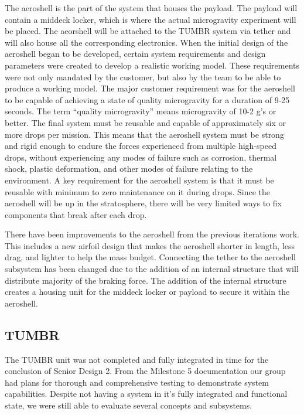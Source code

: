 \indent\indent The aeroshell is the part of the system that houses the payload. The payload will contain a middeck locker, which is where the actual microgravity experiment will be placed. The aeorshell will be attached to the TUMBR system via tether and will also house all the corresponding electronics. When the initial design of the aeroshell began to be developed, certain system requirements and design parameters were created to develop a realistic working model. These requirements were not only mandated by the customer, but also by the team to be able to produce a working model. The major customer requirement was for the aeroshell to be capable of achieving a state of quality microgravity for a duration of 9-25 seconds. The term “quality microgravity” means microgravity of 10-2 g’s or better. The final system must be reusable and capable of approximately six or more drops per mission. This means that the aeroshell system must be strong and rigid enough to endure the forces experienced from multiple high-speed drops, without experiencing any modes of failure such as corrosion, thermal shock, plastic deformation, and other modes of failure relating to the environment. A key requirement for the aeroshell system is that it must be reusable with minimum to zero maintenance on it during drops. Since the aeroshell will be up in the stratosphere, there will be very limited ways to fix components that break after each drop.

There have been improvements to the aeroshell from the previous iterations work. This includes a new airfoil design that makes the aeroshell shorter in length, less drag, and lighter to help the mass budget. Connecting the tether to the aeroshell subsystem has been changed due to the addition of an internal structure that will distribute majority of the braking force. The addition of the internal structure creates a housing unit for the middeck locker or payload to secure it within the aeroshell.

\subsection{TUMBR}

\indent\indent The TUMBR unit was not completed and fully integrated in time for the conclusion of Senior Design 2. From the Milestone 5 documentation our group had plans for thorough and comprehensive testing to demonstrate system capabilities. Despite not having a system in it's fully integrated and functional state, we were still able to evaluate several concepts and subsystems.



